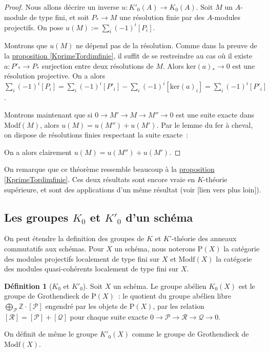 \documentclass{amsart}
\newcommand{\sref}[2]{\hyperref[#2]{#1 \ref*{#2}}}
\theoremstyle{plain}
\theoremstyle{definition}
\newtheorem{defi}[theo]{Définition}
\theoremstyle{remark}
\newcommand{\ensemblenombre }[1]{\mathbb{#1}}
\newcommand{\Z}{\ensemblenombre{Z}}
\newcommand{\Proj}[1]{\mathrm{P}({#1})}
\newcommand{\Modf}[1]{\mathrm{Modf}({#1})}
\newcommand{\ra}{\rightarrow}
\newcommand{\exa}[3]{0\ra {#1}\ra {#2}\ra {#3}\ra 0}
\newcommand{\myker}[1]{\mathrm{ker}({#1})}
\begin{document}
\begin{proof}
  Nous allons décrire un inverse $u:K'_0(A)\ra K_0(A)$. Soit $M$ un $A$-module de type fini, et soit $P_*\ra M$ une résolution finie par des $A$-modules projectifs.
  On pose $u(M):=\sum_i(-1)^i[P_i]$.

  Montrons que $u(M)$ ne dépend pas de la résolution. Comme dans la preuve de la \sref{proposition}{KprimeTordimfinie}, il suffit
  de se restreindre au cas où il existe $a:P'_*\ra P_*$ surjection entre deux résolutions de $M$. Alors $\myker{a}_*\ra 0$ est une résolution projective.
  On a alors $\sum_i(-1)^i[P_i]=\sum_i(-1)^i[P'_i]-\sum_i(-1)^i[\myker{a}_i]=\sum_i(-1)^i[P'_i]$.

  Montrons maintenant que si $\exa{M'}{M}{M''}$ est une suite exacte dans $\Modf{M}$, alors $u(M) = u(M'')+u(M')$.
  Par le lemme du fer à cheval, on dispose de résolutions finies respectant la suite exacte~:
  \begin{center}
  \end{center}
  On a alors clairement $u(M) = u(M'')+u(M')$.
\end{proof}

On remarque que ce théorème ressemble beaucoup à la \sref{proposition}{KprimeTordimfinie}. Ces deux résultats sont encore vraie en $K$-théorie supérieure,
et sont des applications d'un même résultat (voir [lien vers plus loin]).


\subsection{\texorpdfstring{Les groupes $K_0$ et $K'_0$ d'un schéma}{Les groupes K0 et K'0 d'un schéma}}

On peut étendre la definition des groupes de $K$ et $K'$-théorie des anneaux commutatifs aux schémas.
Pour $X$ un schéma, nous noterons $\Proj{X}$ la catégorie des modules projectifs localement de type fini sur $X$
et $\Modf{X}$ la catégorie des modules quasi-cohérents localement de type fini sur $X$.

\begin{defi}[$K_0$  et $K'_0$]
  Soit $X$ un schéma.
  Le groupe abélien $K_0(X)$ est le groupe de Grothendieck de $\Proj{X}$~: le quotient du groupe abélien libre $\bigoplus_\mathcal{P} \Z\cdot [\mathcal{P}]$
  engendré par les objets de $\Proj{X}$,
  par les relation $[\mathcal{R}] = [\mathcal{P}] + [\mathcal{Q}]$ pour chaque suite exacte $0\ra \mathcal{P}\ra \mathcal{R}\ra \mathcal{Q}\ra 0$.

  On définit de même le groupe $K'_0(X)$ comme le groupe de Grothendieck de $\Modf{X}$.
\end{defi}
\end{document}
